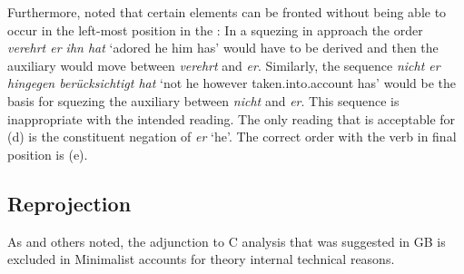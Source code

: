 Furthermore, \citet[Section~2.2]{Reis80a} noted that certain elements can be fronted without being able to occur
in the left-most position in the \mf:
\eal
{}
\zl
In a squezing in approach the order \emph{verehrt er ihn hat} `adored he him has' would have to be derived and then the
auxiliary would move between \emph{verehrt} and \emph{er}. Similarly, the sequence \emph{nicht er
  hingegen berücksichtigt hat} `not he however taken.into.account has' would be the basis for
squezing the auxiliary between \emph{nicht} and \emph{er}. This sequence is inappropriate with the
intended reading. The only reading that is acceptable for (d) is the constituent negation of
\emph{er} `he'. The correct order with the verb in final position is (e).


\subsection{Reprojection}

As \citet[]{Fanselow2009b} and others noted, the adjunction to C analysis that
was suggested in GB is excluded in Minimalist accounts for theory internal technical reasons.

